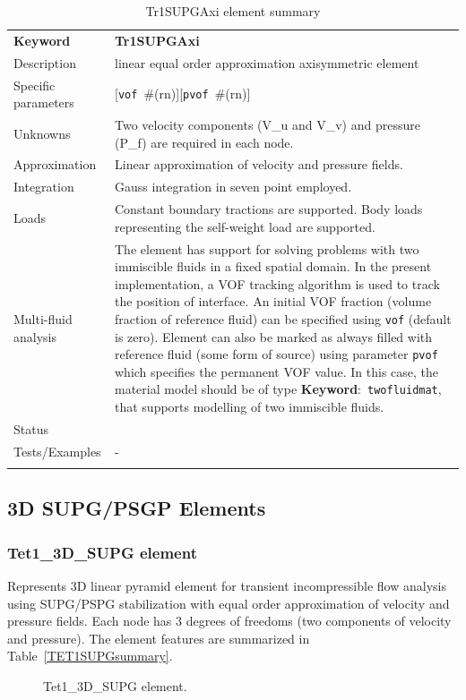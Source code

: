 \documentclass[a4paper]{article}
\newcommand{\descitem}[1]{{\noindent \textbf{#1}}:}
\newcommand{\elemkeyword}[1]{\descitem{Keyword}~\param{#1}} %
\newcommand{\param}[1]{\texttt{#1}} %
\newcommand{\optional}[1]{[#1]} %
\newcommand{\field}[2]{\param{#1}~\#{\tiny(#2)}} %
\newcommand{\optField}[2]{\optional{\field{#1}{#2}}}
\newcommand{\templabel}{}%
\newcommand{\tempcaption}{}%
\newcounter{nelpar}
\newenvironment{elementsummary}[5]{%
  \gdef\tempcaption{#4}%
  \gdef\templabel{#5}%
  \setcounter{nelpar}{0}%
  \begin{center} %
    \begin{table}[!htb] %
      \begin{tabular}{|l|p{9cm}|}\hline %
        {\bf Keyword} & \bf{#1}\\ %
        {Description} & {#2}\\ %
        {Specific parameters} & {#3}\\ \hline %
}{
  \\ \hline %
      \end{tabular}%
      \caption{\tempcaption}%
      \label{\templabel}%
    \end{table}%
  \end{center}%
}
\newcommand{\elementDescription}[2]{{#1} & {#2}\\}
\begin{document}
\begin{elementsummary}{Tr1SUPGAxi}{linear equal order approximation axisymmetric element}
  {\optField{vof}{rn}\optField{pvof}{rn}}{Tr1SUPGAxi element summary}{Tr1SUPGAxisummary}
\elementDescription{Unknowns}{Two velocity components (V\_u and V\_v) and pressure (P\_f) are required in each node.}
\elementDescription{Approximation}{Linear approximation of velocity and pressure fields.}
\elementDescription{Integration}{Gauss integration in seven point employed.}
\elementDescription{Loads}{Constant boundary tractions are supported. Body loads
representing the self-weight load are supported.}
\elementDescription{Multi-fluid analysis}{The element has support for solving
problems with two immiscible fluids in
a fixed spatial domain. In the present implementation, a VOF tracking algorithm
is used to track the position of interface. An initial VOF fraction
(volume fraction of reference fluid) can be specified using
\param{vof} (default is zero). Element can also be marked as always
filled with reference fluid (some form of source) using parameter
\param{pvof} which specifies the permanent VOF value. In this case,
the material model should be of type \elemkeyword{twofluidmat}, that
supports modelling of two immiscible fluids.}
\elementDescription{Status}{}
\elementDescription{Tests/Examples}{-}
\end{elementsummary}


\clearpage
\subsection{3D SUPG/PSGP Elements}
\subsubsection{Tet1\_3D\_SUPG element}
\label{PY1_3D_SUPG}
Represents 3D linear pyramid element for transient
incompressible flow analysis using SUPG/PSPG stabilization with equal order
approximation of velocity and pressure fields. Each node has 3 degrees
of freedoms (two components of velocity and pressure). The element features are summarized in Table~\ref{TET1SUPGsummary}.

\begin{figure}[htb]
 \centering
 \begin{makeimage}
  
 \end{makeimage}
 \caption{Tet1\_3D\_SUPG element.}
 \label{PY1_3D_SUPGfig}
\end{figure}
\end{document}
